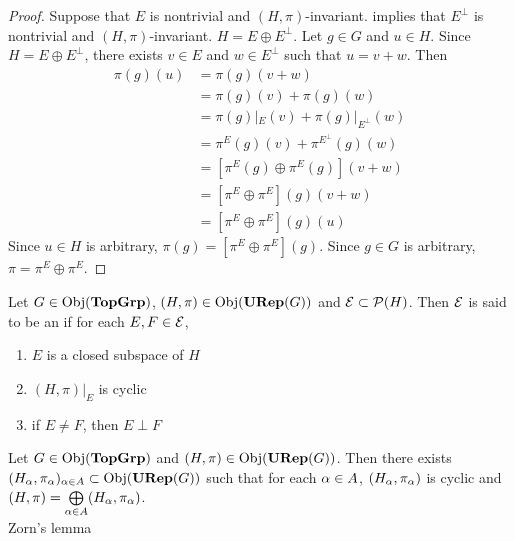 \documentclass{book}
\begin{document}
	\begin{proof}
		Suppose that  $E$ is nontrivial and $(H, \pi)$-invariant.  implies that $E^{\perp}$ is nontrivial and $(H, \pi)$-invariant.  $H = E \oplus E^{\perp}$. Let $g \in G$ and $u \in H$. Since $H = E \oplus E^{\perp}$, there exists $v \in E$ and $w \in E^{\perp}$ such that $u = v + w$. Then  
		\begin{align*}
			\pi(g)(u)
			& = \pi(g)(v +w) \\
			& = \pi(g)(v) + \pi(g)(w) \\
			& = \pi(g)|_E(v) + \pi(g)|_{E^{\perp}}(w) \\
			& = \pi^E(g)(v) + \pi^{E^{\perp}}(g)(w) \\
			& = [\pi^E(g) \oplus \pi^E(g)](v+w) \\
			& = [\pi^E \oplus \pi^E](g)(v+w) \\
			& = [\pi^E \oplus \pi^E](g)(u)
		\end{align*}
		 Since $u \in H$ is arbitrary, $\pi(g) = [\pi^E \oplus \pi^E](g)$. Since $g \in G$ is arbitrary, $\pi = \pi^E \oplus \pi^E$.
	\end{proof}
	
	
	\begin{defn}
		Let $G \in \operatorname{Obj}(\operatorname*{\text{\textbf{TopGrp}}})$, $(H, \pi) \in \operatorname{Obj}(\operatorname*{\text{\textbf{URep}}}(G))$ and $\mathcal{E} \subset \mathcal{P}(H)$. Then $\mathcal{E}$ is said to be an  if for each $E, F \in \mathcal{E}$,
		\begin{enumerate}
			\item $E$ is a closed subspace of $H$
			\item $(H, \pi)|_E$ is cyclic
			\item if $E \neq F$, then $E \perp F$
		\end{enumerate}
	\end{defn}

	\begin{ex}
		Let $G \in \operatorname{Obj}(\operatorname*{\text{\textbf{TopGrp}}})$ and $(H, \pi) \in \operatorname{Obj}(\operatorname*{\text{\textbf{URep}}}(G))$. Then there exists $(H_{\alpha}, \pi_{\alpha})_{\alpha \in A} \subset \operatorname{Obj}(\operatorname*{\text{\textbf{URep}}}(G))$ such that for each $\alpha \in A$, $(H_{\alpha}, \pi_{\alpha})$ is cyclic and $(H, \pi) =  \bigoplus\limits_{\alpha \in A} (H_{\alpha}, \pi_{\alpha}) $. \\
		 Zorn's lemma
	\end{ex}
\end{document}

